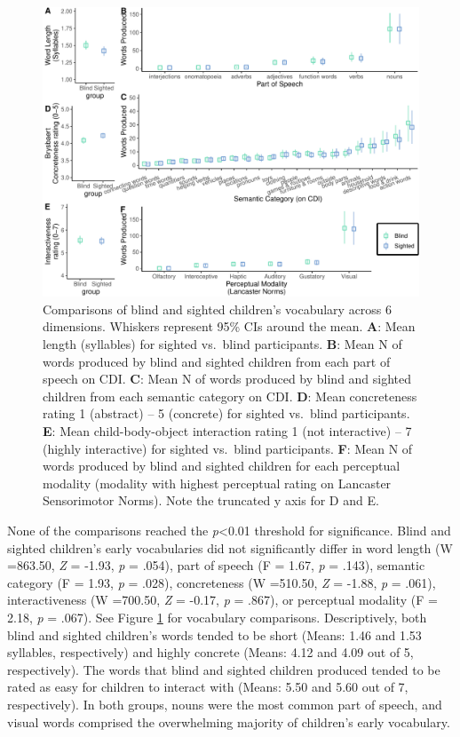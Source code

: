 \documentclass[english,man,floatsintext]{apa6}
\begin{document}
\begin{figure}
\centering
\includegraphics{VI_CDI_manuscript_files/figure-latex/vocab-comparison-1.pdf}
\caption{\label{fig:vocab-comparison}Comparisons of blind and sighted children's vocabulary across 6 dimensions. Whiskers represent 95\% CIs around the mean. \textbf{A}: Mean length (syllables) for sighted vs.~blind participants. \textbf{B}: Mean N of words produced by blind and sighted children from each part of speech on CDI. \textbf{C}: Mean N of words produced by blind and sighted children from each semantic category on CDI. \textbf{D}: Mean concreteness rating 1 (abstract) -- 5 (concrete) for sighted vs.~blind participants. \textbf{E}: Mean child-body-object interaction rating 1 (not interactive) -- 7 (highly interactive) for sighted vs.~blind participants. \textbf{F}: Mean N of words produced by blind and sighted children for each perceptual modality (modality with highest perceptual rating on Lancaster Sensorimotor Norms). Note the truncated y axis for D and E.}
\end{figure}

None of the comparisons reached the \emph{p}\textless{}0.01 threshold for significance. Blind and sighted children's early vocabularies did not significantly differ in word length (W =863.50, \emph{Z} = -1.93, \emph{p} = .054), part of speech (F = 1.67, \emph{p} = .143), semantic category (F = 1.93, \emph{p} = .028), concreteness (W =510.50, \emph{Z} = -1.88, \emph{p} = .061), interactiveness (W =700.50, \emph{Z} = -0.17, \emph{p} = .867), or perceptual modality (F = 2.18, \emph{p} = .067). See Figure \ref{fig:vocab-comparison} for vocabulary comparisons. Descriptively, both blind and sighted children's words tended to be short (Means: 1.46 and 1.53 syllables, respectively) and highly concrete (Means: 4.12 and 4.09 out of 5, respectively). The words that blind and sighted children produced tended to be rated as easy for children to interact with (Means: 5.50 and 5.60 out of 7, respectively). In both groups, nouns were the most common part of speech, and visual words comprised the overwhelming majority of children's early vocabulary.
\end{document}
